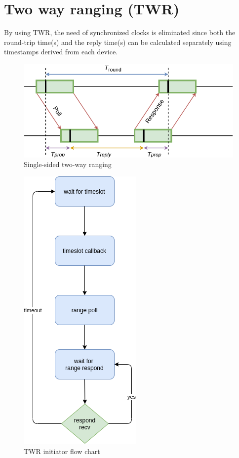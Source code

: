 \documentclass[\main/main.tex]{subfiles}
\begin{document}
\section{Two way ranging (TWR)}
By using TWR, the need of synchronized clocks is eliminated since both the round-trip time(s) and the reply time(s) can be calculated separately using timestamps derived from each device.
\begin{figure}[H]
    \begin{center}
        \includegraphics[scale=0.5]{single_sided_two_way_ranging.png}
    \end{center}
    \caption{Single-sided two-way ranging}
    \label{fig:single_sided_two_way_ranging}
\end{figure}

\begin{figure}[H]
    \begin{center}
        \includegraphics[scale=0.5]{twr_initiator.png}
    \end{center}
    \caption{TWR initiator flow chart}
    \label{fig:twr_initiator}
\end{figure}
\end{document}
